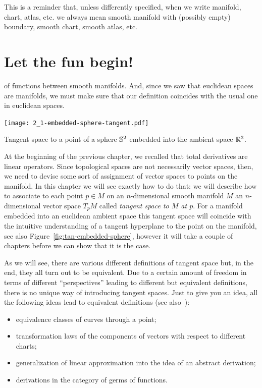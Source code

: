 
\begin{tcolorbox}
  This is a reminder that, unless differently specified, when we write manifold, chart, atlas, etc. we always mean smooth manifold with (possibly empty) boundary, smooth chart, smooth atlas, etc.
\end{tcolorbox}

\section{Let the fun begin!}
 of functions between smooth manifolds.
And, since we saw that euclidean spaces are manifolds, we must make sure that our definition coincides with the usual one in euclidean spaces.

\begin{marginfigure}[7em]
  \texttt{[image: 2\_1-embedded-sphere-tangent.pdf]}
  \label{fig:tan-embedded-sphere}
  \caption{Tangent space to a point of a sphere $\mathbb{S}^2$ embedded into the ambient space $\mathbb{R}^3$.}
\end{marginfigure}
At the beginning of the previous chapter, we recalled that total derivatives are linear operators.
Since topological spaces are not necessarily vector spaces, then, we need to devise some sort of assignment of vector spaces to points on the manifold.
In this chapter we will see exactly how to do that: we will describe how to associate to each point $p\in M$ on an $n$-dimensional smooth manifold $M$ an $n$-dimensional vector space $T_p M$ called \emph{tangent space to $M$ at $p$}.
For a manifold embedded into an euclidean ambient space this tangent space will coincide with the intuitive understanding of a tangent hyperplane to the point on the manifold, see also Figure~\ref{fig:tan-embedded-sphere}, however it will take a couple of chapters before we can show that it is the case.

As we will see, there are various different definitions of tangent space but, in the end, they all turn out to be equivalent.
Due to a certain amount of freedom in terms of different ``perspectives'' leading to different but equivalent definitions, there is no unique way of introducing tangent spaces.
Just to give you an idea, all the following ideas lead to equivalent definitions (see also~\cite{book:lee}):
\begin{itemize}
  \item equivalence classes of curves through a point;
  \item transformation laws of the components of vectors with respect to different charts;
  \item generalization of linear approximation into the idea of an abstract derivation;
  \item derivations in the category of germs of functions.
\end{itemize}

